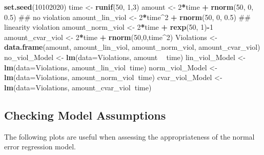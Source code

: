 \documentclass[]{book}
\newenvironment{Shaded}{\begin{snugshade}}{\end{snugshade}}
\newcommand{\KeywordTok}[1]{\textcolor[rgb]{0.13,0.29,0.53}{\textbf{#1}}}
\newcommand{\DataTypeTok}[1]{\textcolor[rgb]{0.13,0.29,0.53}{#1}}
\newcommand{\DecValTok}[1]{\textcolor[rgb]{0.00,0.00,0.81}{#1}}
\newcommand{\FloatTok}[1]{\textcolor[rgb]{0.00,0.00,0.81}{#1}}
\newcommand{\StringTok}[1]{\textcolor[rgb]{0.31,0.60,0.02}{#1}}
\newcommand{\OperatorTok}[1]{\textcolor[rgb]{0.81,0.36,0.00}{\textbf{#1}}}
\newcommand{\NormalTok}[1]{#1}
\begin{document}
\begin{Shaded}
\begin{Highlighting}[]
\KeywordTok{set.seed}\NormalTok{(}\DecValTok{10102020}\NormalTok{)}
\NormalTok{time <-}\StringTok{ }\KeywordTok{runif}\NormalTok{(}\DecValTok{50}\NormalTok{, }\DecValTok{1}\NormalTok{,}\DecValTok{3}\NormalTok{)}
\NormalTok{amount <-}\StringTok{ }\DecValTok{2}\OperatorTok{*}\NormalTok{time }\OperatorTok{+}\StringTok{ }\KeywordTok{rnorm}\NormalTok{(}\DecValTok{50}\NormalTok{, }\DecValTok{0}\NormalTok{, }\FloatTok{0.5}\NormalTok{)  ## no violation}
\NormalTok{amount_lin_viol <-}\StringTok{ }\DecValTok{2}\OperatorTok{*}\NormalTok{time}\OperatorTok{^}\DecValTok{2} \OperatorTok{+}\StringTok{ }\KeywordTok{rnorm}\NormalTok{(}\DecValTok{50}\NormalTok{, }\DecValTok{0}\NormalTok{, }\FloatTok{0.5}\NormalTok{) ## linearity violation}
\NormalTok{amount_norm_viol <-}\StringTok{ }\DecValTok{2}\OperatorTok{*}\NormalTok{time }\OperatorTok{+}\StringTok{ }\KeywordTok{rexp}\NormalTok{(}\DecValTok{50}\NormalTok{, }\DecValTok{1}\NormalTok{)}\OperatorTok{-}\DecValTok{1}
\NormalTok{amount_cvar_viol <-}\StringTok{ }\DecValTok{2}\OperatorTok{*}\NormalTok{time }\OperatorTok{+}\StringTok{ }\KeywordTok{rnorm}\NormalTok{(}\DecValTok{50}\NormalTok{,}\DecValTok{0}\NormalTok{,time}\OperatorTok{^}\DecValTok{2}\NormalTok{)}
\NormalTok{Violations <-}\StringTok{ }\KeywordTok{data.frame}\NormalTok{(amount, amount_lin_viol, amount_norm_viol, amount_cvar_viol)}
\NormalTok{no_viol_Model <-}\StringTok{ }\KeywordTok{lm}\NormalTok{(}\DataTypeTok{data=}\NormalTok{Violations, amount }\OperatorTok{~}\StringTok{ }\NormalTok{time)}
\NormalTok{lin_viol_Model <-}\StringTok{ }\KeywordTok{lm}\NormalTok{(}\DataTypeTok{data=}\NormalTok{Violations, amount_lin_viol}\OperatorTok{~}\NormalTok{time)}
\NormalTok{norm_viol_Model <-}\StringTok{ }\KeywordTok{lm}\NormalTok{(}\DataTypeTok{data=}\NormalTok{Violations, amount_norm_viol}\OperatorTok{~}\NormalTok{time)}
\NormalTok{cvar_viol_Model <-}\StringTok{ }\KeywordTok{lm}\NormalTok{(}\DataTypeTok{data=}\NormalTok{Violations, amount_cvar_viol}\OperatorTok{~}\NormalTok{time)}
\end{Highlighting}
\end{Shaded}

\subsection{Checking Model
Assumptions}\label{checking-model-assumptions}

The following plots are useful when assessing the appropriateness of the
normal error regression model.
\end{document}
